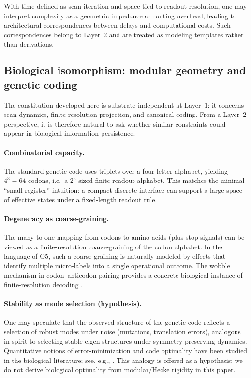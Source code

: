 With time defined as scan iteration and space tied to readout resolution, one may interpret complexity as a geometric impedance or routing overhead, leading to architectural correspondences between delays and computational costs. Such correspondences belong to Layer~2 and are treated as modeling templates rather than derivations.

\subsection{Biological isomorphism: modular geometry and genetic coding}
\label{sec:biological_isomorphism}

The constitution developed here is substrate-independent at Layer~1: it concerns scan dynamics, finite-resolution projection, and canonical coding. From a Layer~2 perspective, it is therefore natural to ask whether similar constraints could appear in biological information persistence.

\paragraph{Combinatorial capacity.}
The standard genetic code uses triplets over a four-letter alphabet, yielding $4^3=64$ codons, i.e.\ a $2^6$-sized finite readout alphabet. This matches the minimal ``small register'' intuition: a compact discrete interface can support a large space of effective states under a fixed-length readout rule.

\paragraph{Degeneracy as coarse-graining.}
The many-to-one mapping from codons to amino acids (plus stop signals) can be viewed as a finite-resolution coarse-graining of the codon alphabet. In the language of O5, such a coarse-graining is naturally modeled by effects that identify multiple micro-labels into a single operational outcome. The wobble mechanism in codon--anticodon pairing provides a concrete biological instance of finite-resolution decoding \cite{Crick1966}.

\paragraph{Stability as mode selection (hypothesis).}
One may speculate that the observed structure of the genetic code reflects a selection of robust modes under noise (mutations, translation errors), analogous in spirit to selecting stable eigen-structures under symmetry-preserving dynamics. Quantitative notions of error-minimization and code optimality have been studied in the biological literature; see, e.g., \cite{HaigHurst1991,FreelandHurst1998OneInAMillion,FreelandHurst1998LoadMinimization,FreelandKnightLandweberHurst2000}. This analogy is offered as a hypothesis: we do not derive biological optimality from modular/Hecke rigidity in this paper.

